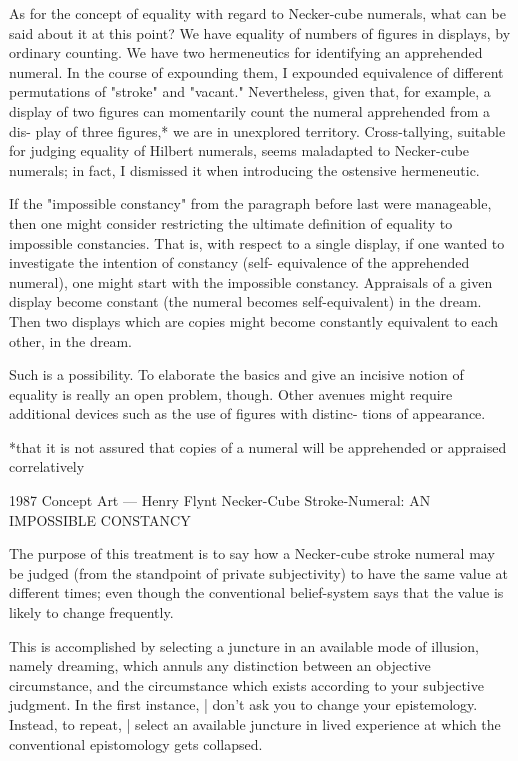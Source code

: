 As for the concept of equality with regard to Necker-cube numerals, 
what can be said about it at this point? We have equality of numbers of 
figures in displays, by ordinary counting. We have two hermeneutics 
for identifying an apprehended numeral. In the course of expounding 
them, I expounded equivalence of different permutations of "stroke" 
and "vacant." Nevertheless, given that, for example, a display of two 
figures can momentarily count the numeral apprehended from a dis- 
play of three figures,* we are in unexplored territory. Cross-tallying, 
suitable for judging equality of Hilbert numerals, seems maladapted to 
Necker-cube numerals; in fact, I dismissed it when introducing the 
ostensive hermeneutic. 

If the "impossible constancy" from the paragraph before last were 
manageable, then one might consider restricting the ultimate definition 
of equality to impossible constancies. That is, with respect to a single 
display, if one wanted to investigate the intention of constancy (self- 
equivalence of the apprehended numeral), one might start with the 
impossible constancy. Appraisals of a given display become constant 
(the numeral becomes self-equivalent) in the dream. Then two displays 
which are copies might become constantly equivalent to each other, in 
the dream. 

Such is a possibility. To elaborate the basics and give an incisive 
notion of equality is really an open problem, though. Other avenues 
might require additional devices such as the use of figures with distinc- 
tions of appearance. 


*that it is not assured that copies of a numeral will be apprehended or 
appraised correlatively 


1987 Concept Art --- Henry Flynt 
Necker-Cube Stroke-Numeral: AN IMPOSSIBLE CONSTANCY 


The purpose of this treatment is to say how a Necker-cube stroke numeral may be 
judged (from the standpoint of private subjectivity) to have the same value at different 
times; even though the conventional belief-system says that the value is likely to change 
frequently. 


This is accomplished by selecting a juncture in an available mode of illusion, namely 
dreaming, which annuls any distinction between an objective circumstance, and the 
circumstance which exists according to your subjective judgment. In the first instance, | 
don't ask you to change your epistemology. Instead, to repeat, | select an available juncture 
in lived experience at which the conventional epistomology gets collapsed. 


